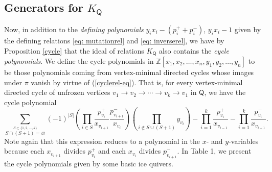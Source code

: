 \documentclass[ALCO,published]{cedram}
\numberwithin{equation}{section}
\newcommand{\Z}{\mathbb{Z}}
\renewcommand{\emptyset}{\varnothing}
\newcommand{\1}{^{-1}}
\def\Q{\mathsf{Q}}
\begin{document}
\subsection{Generators for $K_\Q$}\label{sect:generators}
Now, in addition to the \textit{defining polynomials} $y_ix_i - (p_i^+ + p_i^-)$, $y_ix_i - 1$ given by the defining relations \eqref{eq: mutationrel} and \eqref{eq: inverserel}, we have by Proposition \ref{cycle} that the ideal of relations $K_\Q$ also contains the \textit{cycle polynomials}. We define the cycle polynomials in $\Z[x_1,x_2,\dots,x_n,y_1,y_2,\dots,y_n]$ to be those polynomials coming from vertex-minimal directed cycles whose images under $\pi$ vanish by virtue of (\ref{cyclerel-eq}). That is, for every vertex-minimal  directed cycle of unfrozen vertices $v_1 \to v_2 \to \cdots \to v_k \to v_1$ in $\Q$, we have the cycle polynomial
\[
\sum_{\stackrel{S\subset \{1,2,\dots,k\}}{S\cap (S+1)=\emptyset}} (-1)^{|S|}\left(\prod_{i\in S} \frac{p_{v_i}^+}{x_{v_{i+1}}}\frac{p_{v_{i+1}}^-}{x_{v_i}}\right)\left(\prod_{i\not\in S\cup (S+1)} y_{v_i}\right) - \prod_{i=1}^k\frac{p_{v_i}^+}{x_{v_{i-1}}}- \prod_{i=1}^k\frac{p_{v_i}^-}{x_{v_{i+1}}}.
\]
Note again that this expression reduces to a polynomial in the $x$- and $y$-variables because each $x_{v_{i+1}}$ divides $p_{v_i}^+$ and each $x_{v_i}$ divides $p_{v_{i+1}}^-$. In Table 1, we present the cycle polynomials given by some basic ice quivers.
\end{document}
